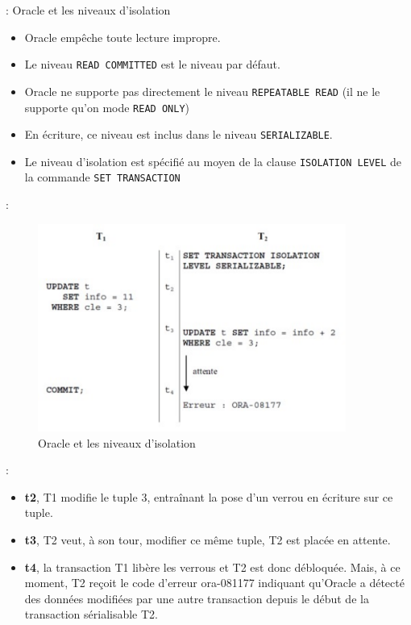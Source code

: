 \documentclass[10pt]{beamer}
\begin{document}
\begin{frame}{\secname : \subsecname}
    Oracle et les niveaux d'isolation
    \begin{itemize}
        \item Oracle empêche toute lecture impropre.
        \item Le niveau \lstinline[language=plsql]!READ COMMITTED! est le niveau par défaut.
        \item Oracle ne supporte pas directement le niveau \lstinline[language=plsql]!REPEATABLE READ! (il ne le supporte qu'on mode \lstinline[language=plsql]!READ ONLY!)
        \item En écriture, ce niveau est inclus dans le niveau \lstinline[language=plsql]!SERIALIZABLE!.
        \item Le niveau d'isolation est spécifié au moyen de la clause \lstinline[language=plsql]!ISOLATION LEVEL! de la commande \lstinline[language=plsql]!SET TRANSACTION!
    \end{itemize}
\end{frame}

\begin{frame}{\secname : \subsecname}
    \begin{figure}
        \begin{center}
            \includegraphics[width=0.9\textwidth]{../assets/img/coherence-de-lecture-4.pdf}
            \caption{Oracle et les niveaux d'isolation}
        \end{center}
    \end{figure}
\end{frame}
\begin{frame}{\secname : \subsecname}
    \begin{itemize}
        \item \textbf{t2}, T1 modifie le tuple 3, entraînant la pose d'un verrou en écriture sur ce tuple.
        \item \textbf{t3}, T2 veut, à son tour, modifier ce même tuple, T2 est placée en attente.
        \item \textbf{t4}, la transaction T1 libère les verrous et T2 est donc débloquée. Mais, à ce moment, T2 reçoit le code d'erreur ora-081177 indiquant qu'Oracle a détecté des données modifiées par une autre transaction depuis le début de la transaction sérialisable T2.
    \end{itemize}
\end{frame}
\end{document}
